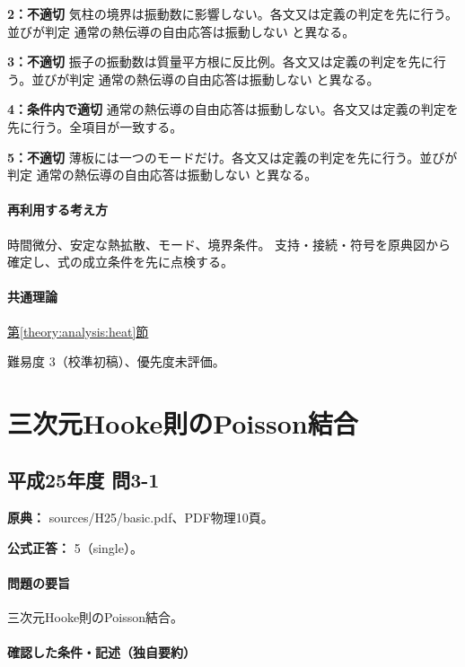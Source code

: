 \noindent\textbf{2：不適切} 気柱の境界は振動数に影響しない。各文又は定義の判定を先に行う。並びが判定 通常の熱伝導の自由応答は振動しない と異なる。\par

\noindent\textbf{3：不適切} 振子の振動数は質量平方根に反比例。各文又は定義の判定を先に行う。並びが判定 通常の熱伝導の自由応答は振動しない と異なる。\par

\noindent\textbf{4：条件内で適切} 通常の熱伝導の自由応答は振動しない。各文又は定義の判定を先に行う。全項目が一致する。\par

\noindent\textbf{5：不適切} 薄板には一つのモードだけ。各文又は定義の判定を先に行う。並びが判定 通常の熱伝導の自由応答は振動しない と異なる。\par

\paragraph{再利用する考え方} 時間微分、安定な熱拡散、モード、境界条件。 支持・接続・符号を原典図から確定し、式の成立条件を先に点検する。

\paragraph{共通理論} \hyperref[theory:analysis:heat]{第\ref*{theory:analysis:heat}節}

\par 難易度 3（校準初稿）、優先度未評価。

\section{三次元Hooke則のPoisson結合}

\subsection{平成25年度 問3-1}
\label{q:h25-reg-basic-3-1}

\noindent\textbf{原典：} sources/H25/basic.pdf、PDF物理10頁。

\textbf{公式正答：} 5（single）。

\paragraph{問題の要旨} 三次元Hooke則のPoisson結合。

\paragraph{確認した条件・記述（独自要約）}\mbox{}\par

